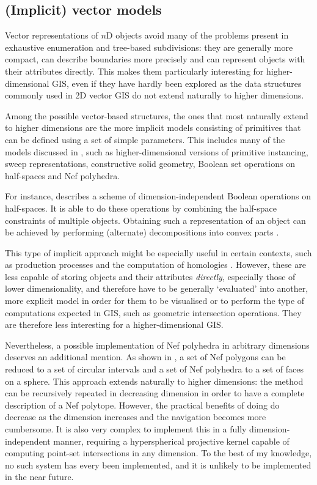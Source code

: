 \subsection{(Implicit) vector models}
\label{ss:implicit-models}

Vector representations of $n$D objects avoid many of the problems present in exhaustive enumeration and tree-based subdivisions: they are generally more compact, can describe boundaries more precisely and can represent objects with their attributes directly.
This makes them particularly interesting for higher-dimensional GIS, even if they have hardly been explored as the data structures commonly used in 2D vector GIS do not extend naturally to higher dimensions.

Among the possible vector-based structures, the ones that most naturally extend to higher dimensions are the more implicit models consisting of primitives that can be defined using a set of simple parameters.
This includes many of the models discussed in , such as higher-dimensional versions of primitive instancing, sweep representations, constructive solid geometry, Boolean set operations on half-spaces and Nef polyhedra.

For instance, \citet{Paoluzzi04} describes a scheme of dimension-independent Boolean operations on half-spaces.
It is able to do these operations by combining the half-space constraints of multiple objects.
Obtaining such a representation of an object can be achieved by performing (alternate) decompositions into convex parts \citep{Bulbul09a,Lien06}.

This type of implicit approach might be especially useful in certain contexts, such as production processes and the computation of homologies \citep{Damiand08}.
However, these are less capable of storing objects and their attributes \emph{directly}, especially those of lower dimensionality, and therefore have to be generally `evaluated' into another, more explicit model in order for them to be visualised \citep{Mantyla88} or to perform the type of computations expected in GIS, such as geometric intersection operations.
They are therefore less interesting for a higher-dimensional GIS.\@

Nevertheless, a possible implementation of Nef polyhedra in arbitrary dimensions deserves an additional mention.
As shown in , a set of Nef polygons can be reduced to a set of circular intervals and a set of Nef polyhedra to a set of faces on a sphere.
This approach extends naturally to higher dimensions: the method can be recursively repeated in decreasing dimension in order to have a complete description of a Nef polytope.
However, the practical benefits of doing do decrease as the dimension increases and the navigation becomes more cumbersome.
It is also very complex to implement this in a fully dimension-independent manner, requiring a hyperspherical projective kernel capable of computing point-set intersections in any dimension.
To the best of my knowledge, no such system has every been implemented, and it is unlikely to be implemented in the near future.

